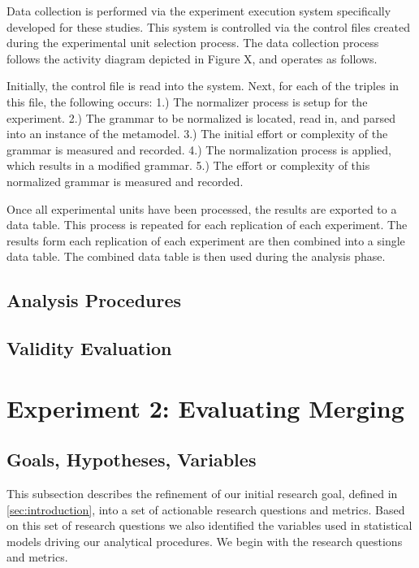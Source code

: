 \documentclass[10pt,nocc]{xrese_report}
\begin{document}
Data collection is performed via the experiment execution system specifically developed for these studies. This system is controlled via the control files created during the experimental unit selection process. The data collection process follows the activity diagram depicted in Figure X, and operates as follows.

Initially, the control file is read into the system. Next, for each of the triples in this file, the following occurs: 1.) The normalizer process is setup for the experiment. 2.) The grammar to be normalized is located, read in, and parsed into an instance of the metamodel. 3.) The initial effort or complexity of the grammar is measured and recorded. 4.) The normalization process is applied, which results in a modified grammar. 5.) The effort or complexity of this normalized grammar is measured and recorded.

Once all experimental units have been processed, the results are exported to a data table. This process is repeated for each replication of each experiment. The results form each replication of each experiment are then combined into a single data table. The combined data table is then used during the analysis phase.

\subsection{Analysis Procedures}

\subsection{Validity Evaluation}

\section{Experiment 2: Evaluating Merging}

\subsection{Goals, Hypotheses, Variables}

This subsection describes the refinement of our initial research goal, defined in \ref{sec:introduction}, into a set of actionable research questions and metrics. Based on this set of research questions we also identified the variables used in statistical models driving our analytical procedures. We begin with the research questions and metrics.
\end{document}
